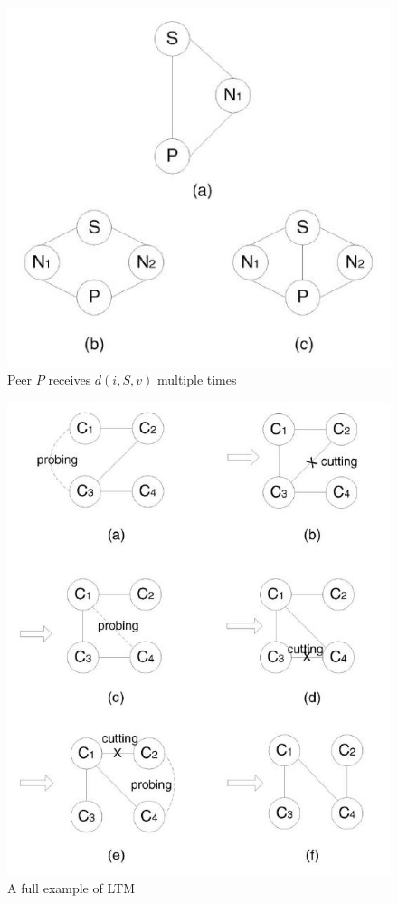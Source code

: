 \documentclass[a4paper,10pt]{article}
\begin{document}
\begin{figure}
\centering
  \includegraphics[scale=0.4]{img/ltm_multid.jpeg}
\caption{Peer $P$ receives $d(i, S, v)$ multiple times}
\label{figure:ltm_multid}
\end{figure}

\begin{figure}
\centering
  \includegraphics[scale=0.4]{img/ltm_example.jpeg}
\caption{A full example of LTM}
\label{figure:ltm_example}
\end{figure}
\end{document}
